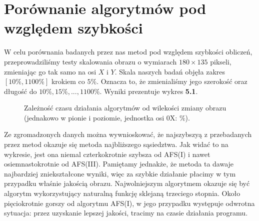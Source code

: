 \section{Porównanie algorytmów pod względem szybkości}
W celu porównania badanych przez nas metod pod  względem szybkości obliczeń,
przeprowadziliśmy testy skalowania obrazu o wymiarach $180\times135$ pikseli,
zmieniając go tak samo na osi $X$ i $Y$. Skala naszych badań objęła zakres
$[10\%, 1100\%]$ krokiem co $5\%$. Oznacza to, że zmienialiśmy jego szerokość
oraz długość do $10\%, 15\%, ... ,1100\%$. Wyniki prezentuje wykres \textbf{5.1}.
\begin{figure}[h!tb]
\begin{center}

\caption{Zależność czasu działania algorytmów od wilekości zmiany obrazu (jednakowo w pionie i poziomie, jednostka osi 0X: $\%$).}
\end{center}
\end{figure}

Ze zgromadzonych danych można wywnioskować, że najszybszyą z przebadanych przez
metod okazuje się metoda najbliższego sąsiedztwa. Jak widać to na wykresie, jest
ona niemal czterkokrotnie szybsza od AFS(I) i nawet osiemnastokrotnie od AFS(III).
Pamiętamy jednakże, że metoda ta dawaje najbardziej zniekształcone wyniki, więc
za szybkie działanie płacimy w tym przypadku właśnie jakością obrazu.
Najwolniejszym algorytmem okazuje się być algorytm wykorzystujący naturalną
funkcję sklejaną trzeciego stopnia. Około pięciokrotnie gorszy od algorytmu AFS(I),
w jego przypadku występuje odwrotna sytuacja: przez uzyskanie lepszej jakości,
tracimy na czasie działania programu.


